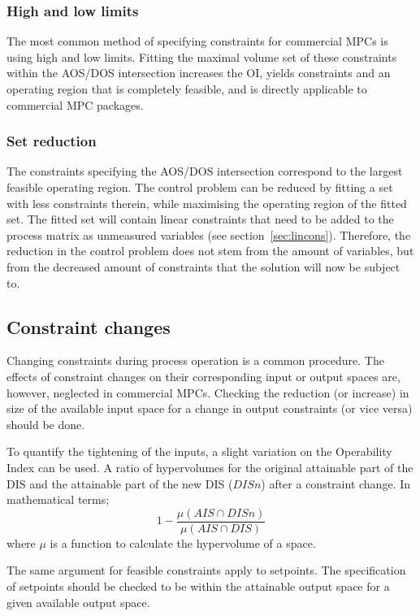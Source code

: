 \documentclass[final,authoryear,5pt,times,twocolumn]{elsarticle}
\begin{document}
\subsubsection{High and low limits}
The most common method of specifying constraints for commercial MPCs is using high and low limits.
Fitting the maximal volume set of these constraints within the AOS/DOS intersection increases the OI, yields constraints and an operating region that is completely feasible, and is directly applicable to commercial MPC packages.
\subsubsection{Set reduction}
The constraints specifying the AOS/DOS intersection correspond to the largest feasible operating region.
The control problem can be reduced by fitting a set with less constraints therein, while maximising the operating region of the fitted set.
The fitted set will contain linear constraints that need to be added to the process matrix as unmeasured variables (see section~\ref{sec:lincons}).
Therefore, the reduction in the control problem does not stem from the amount of variables, but from the decreased amount of constraints that the solution will now be subject to.

\subsection{Constraint changes}
Changing constraints during process operation is a common procedure.
The effects of constraint changes on their corresponding input or output spaces are, however, neglected in commercial MPCs.
Checking the reduction (or increase) in size of the available input space for a change in output constraints (or vice versa) should be done.

To quantify the tightening of the inputs, a slight variation on the Operability Index can be used.
A ratio of hypervolumes for the original attainable part of the DIS and the attainable part of the new DIS ($DISn$) after a constraint change.
In mathematical terms;
\begin{equation}
  \label{eq:inputclamp}
  1-\frac{\mu(AIS \cap DISn)}{\mu(AIS \cap DIS)}
\end{equation}
where $\mu$ is a function to calculate the hypervolume of a space.

The same argument for feasible constraints apply to setpoints.
The specification of setpoints should be checked to be within the attainable output space for a given available output space.
\end{document}
